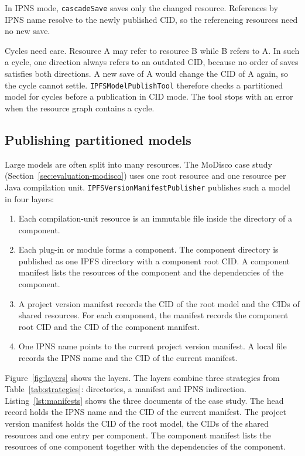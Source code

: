 \documentclass[iicol,pdflatex,sn-mathphys-num]{sn-jnl}
\theoremstyle{thmstylethree}%
\begin{document}
In IPNS mode, \texttt{cascadeSave} saves only the changed resource. References by IPNS name resolve to the newly published CID, so the referencing resources need no new save.

Cycles need care. Resource A may refer to resource B while B refers to A. In such a cycle, one direction always refers to an outdated CID, because no order of saves satisfies both directions. A new save of A would change the CID of A again, so the cycle cannot settle. \texttt{IPFSModelPublishTool} therefore checks a partitioned model for cycles before a publication in CID mode. The tool stops with an error when the resource graph contains a cycle.

\subsection{Publishing partitioned models}\label{sec:rq2-partitioned}

Large models are often split into many resources. The MoDisco case study (Section~\ref{sec:evaluation-modisco}) uses one root resource and one resource per Java compilation unit. \texttt{IPFSVersionManifestPublisher} publishes such a model in four layers:
\begin{enumerate}
\item Each compilation-unit resource is an immutable file inside the directory of a component.
\item Each plug-in or module forms a component. The component directory is published as one IPFS directory with a component root CID. A component manifest lists the resources of the component and the dependencies of the component.
\item A project version manifest records the CID of the root model and the CIDs of shared resources. For each component, the manifest records the component root CID and the CID of the component manifest.
\item One IPNS name points to the current project version manifest. A local file records the IPNS name and the CID of the current manifest.
\end{enumerate}

Figure~\ref{fig:layers} shows the layers. The layers combine three strategies from Table~\ref{tab:strategies}: directories, a manifest and IPNS indirection. Listing~\ref{lst:manifests} shows the three documents of the case study. The head record holds the IPNS name and the CID of the current manifest. The project version manifest holds the CID of the root model, the CIDs of the shared resources and one entry per component. The component manifest lists the resources of one component together with the dependencies of the component.
\end{document}
